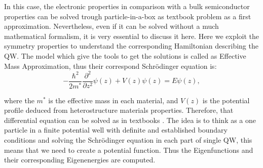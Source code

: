 In this case, the electronic properties in comparison with a bulk semiconductor properties can be solved trough particle-in-a-box as textbook problem as a first approximation. Nevertheless, even if it can be solved  without  a much mathematical formalism, it is very essential to discuss it here. 
Here we exploit the symmetry properties to understand the corresponding Hamiltonian describing the \gls{QW}.
The model which give the tools to get the solutions is called as Effective Mass Approximation, thus their correspond Schrödinger equation is\cite{harrison2016quantum,chuang1995physics,singh2003electronic,bastard1990wave,fox2002optical,davies1998physics}: 
\begin{equation}\label{eq:chapter-1-ema-schroedinger}
	-\dfrac{\hbar^{2}}{2m^{*}}\dfrac{\partial^{2}}{\partial {z}^{2}}\psi(z)+V(z)\psi(z)=E\psi(z),
\end{equation}

where the $m^{*}$ is the effective mass in each material, and $V(z)$ is the potential profile deduced from  heterostructure materials properties. Therefore, that differential equation can be solved as in textbooks \cite{de2014introduccion,griffiths2018introduction,sakurai1995modern,cohen2019quantum,chuang1995physics,harrison2016quantum,fox2002optical,bastard1990wave}. The idea is to think as a one particle in a finite potential well with definite and established  boundary conditions and solving the Schrödinger equation in each part of single \gls{QW}, this means that we need to create a potential function. Thus the Eigenfunctions and their corresponding Eigenenergies are computed.

